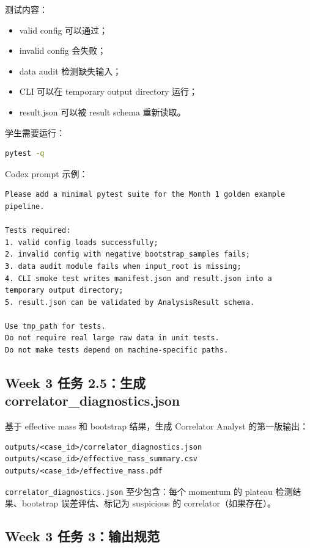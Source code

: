\documentclass[11pt,a4paper,fontset=fandol]{ctexart}
\begin{document}
测试内容：

\begin{itemize}[leftmargin=2em]
  \item valid config 可以通过；
  \item invalid config 会失败；
  \item data audit 检测缺失输入；
  \item CLI 可以在 temporary output directory 运行；
  \item result.json 可以被 result schema 重新读取。
\end{itemize}

学生需要运行：

\begin{lstlisting}[language=bash]
pytest -q
\end{lstlisting}

Codex prompt 示例：

\begin{lstlisting}
Please add a minimal pytest suite for the Month 1 golden example pipeline.

Tests required:
1. valid config loads successfully;
2. invalid config with negative bootstrap_samples fails;
3. data audit module fails when input_root is missing;
4. CLI smoke test writes manifest.json and result.json into a temporary output directory;
5. result.json can be validated by AnalysisResult schema.

Use tmp_path for tests.
Do not require real large raw data in unit tests.
Do not make tests depend on machine-specific paths.
\end{lstlisting}

\subsection{Week 3 任务 2.5：生成 correlator\_diagnostics.json}

基于 effective mass 和 bootstrap 结果，生成 Correlator Analyst 的第一版输出：

\begin{lstlisting}
outputs/<case_id>/correlator_diagnostics.json
outputs/<case_id>/effective_mass_summary.csv
outputs/<case_id>/effective_mass.pdf
\end{lstlisting}

\texttt{correlator\_diagnostics.json} 至少包含：每个 momentum 的 plateau 检测结果、bootstrap 误差评估、标记为 suspicious 的 correlator（如果存在）。

\subsection{Week 3 任务 3：输出规范}
\end{document}
